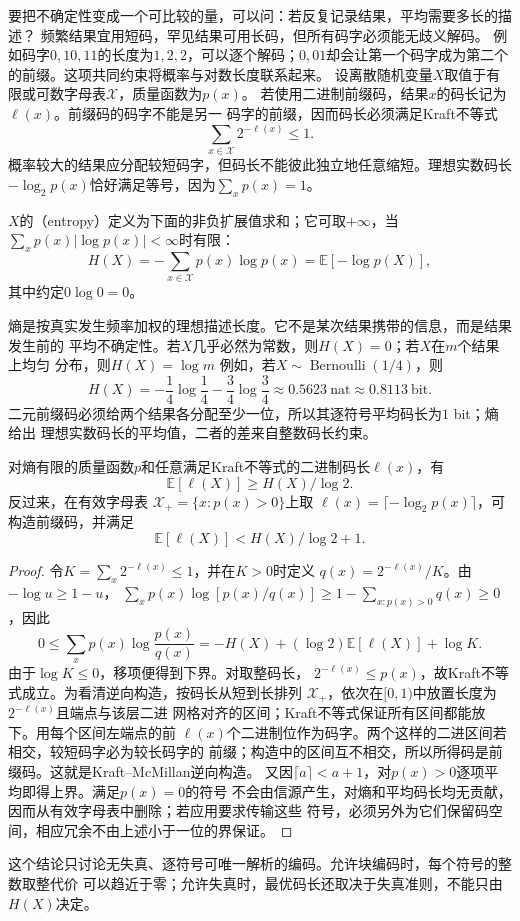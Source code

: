 要把不确定性变成一个可比较的量，可以问：若反复记录结果，平均需要多长的描述？
频繁结果宜用短码，罕见结果可用长码，但所有码字必须能无歧义解码。
例如码字$0,10,11$的长度为$1,2,2$，可以逐个解码；$0,01$却会让第一个码字成为第二个
的前缀。这项共同约束将概率与对数长度联系起来。
设离散随机变量\(X\)取值于有限或可数字母表\(\mathcal{X}\)，质量函数为\(p(x)\)。
若使用二进制前缀码，结果\(x\)的码长记为\(\ell(x)\)。前缀码的码字不能是另一
码字的前缀，因而码长必须满足Kraft不等式
\[
  \sum_{x\in\mathcal{X}}2^{-\ell(x)}\leq1.
\]
概率较大的结果应分配较短码字，但码长不能彼此独立地任意缩短。理想实数码长
\(-\log_2p(x)\)恰好满足等号，因为\(\sum_xp(x)=1\)。
\begin{definition}[离散熵]
\label{def:information-discrete-entropy}
\(X\)的（entropy）定义为下面的非负扩展值求和；它可取\(+\infty\)，当\(\sum_xp(x)|\log p(x)|<\infty\)时有限：
\begin{equation}
  H(X)
  =
  -\sum_{x\in\mathcal{X}}p(x)\log p(x)
  =
  \mathbb{E}[-\log p(X)],
  \label{eq:information-discrete-entropy}
\end{equation}
其中约定\(0\log0=0\)。
\end{definition}
熵是按真实发生频率加权的理想描述长度。它不是某次结果携带的信息，而是结果发生前的
平均不确定性。若\(X\)几乎必然为常数，则\(H(X)=0\)；若\(X\)在\(m\)个结果上均匀
分布，则\(H(X)=\log m\)
例如，若\(X\sim\operatorname{Bernoulli}(1/4)\)，则
\[
  H(X)
  =
  -\frac14\log\frac14-\frac34\log\frac34
  \approx0.5623\ \text{nat}
  \approx0.8113\ \text{bit}.
\]
二元前缀码必须给两个结果各分配至少一位，所以其逐符号平均码长为\(1\) bit；熵给出
理想实数码长的平均值，二者的差来自整数码长约束。
\begin{theorem}[无失真前缀码的平均长度界]
\label{thm:information-source-coding-bound}
对熵有限的质量函数\(p\)和任意满足Kraft不等式的二进制码长\(\ell(x)\)，有
\[
  \mathbb{E}[\ell(X)]\geq H(X)/\log2.
\]
反过来，在有效字母表
\(\mathcal X_+=\{x:p(x)>0\}\)上取
\(\ell(x)=\lceil-\log_2p(x)\rceil\)，可构造前缀码，并满足
\[
  \mathbb{E}[\ell(X)]<H(X)/\log2+1.
\]
\end{theorem}
\begin{proof}
令\(K=\sum_x2^{-\ell(x)}\leq1\)，并在\(K>0\)时定义
\(q(x)=2^{-\ell(x)}/K\)。由\(-\log u\geq1-u\)，
\(\sum_xp(x)\log[p(x)/q(x)]\geq
1-\sum_{x:p(x)>0}q(x)\geq0\)，因此
\[
  0\leq\sum_xp(x)\log\frac{p(x)}{q(x)}
  =
  -H(X)+(\log2)\mathbb{E}[\ell(X)]+\log K.
\]
由于\(\log K\leq0\)，移项便得到下界。对取整码长，
\(2^{-\ell(x)}\leq p(x)\)，故Kraft不等式成立。为看清逆向构造，按码长从短到长排列
\(\mathcal X_+\)，依次在\([0,1)\)中放置长度为\(2^{-\ell(x)}\)且端点与该层二进
网格对齐的区间；Kraft不等式保证所有区间都能放下。用每个区间左端点的前
\(\ell(x)\)个二进制位作为码字。两个这样的二进区间若相交，较短码字必为较长码字的
前缀；构造中的区间互不相交，所以所得码是前缀码。这就是Kraft--McMillan逆向构造。
又因\(\lceil a\rceil<a+1\)，对\(p(x)>0\)逐项平均即得上界。满足\(p(x)=0\)的符号
不会由信源产生，对熵和平均码长均无贡献，因而从有效字母表中删除；若应用要求传输这些
符号，必须另外为它们保留码空间，相应冗余不由上述小于一位的界保证。
\end{proof}
这个结论只讨论无失真、逐符号可唯一解析的编码。允许块编码时，每个符号的整数取整代价
可以趋近于零；允许失真时，最优码长还取决于失真准则，不能只由\(H(X)\)决定。
